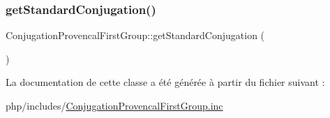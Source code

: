 \hypertarget{class_conjugation_provencal_first_group_aedd116ac330b4c069c860612d624badc}{}\label{class_conjugation_provencal_first_group_aedd116ac330b4c069c860612d624badc} 
\subsubsection{\texorpdfstring{get\+Standard\+Conjugation()}{getStandardConjugation()}}
{\footnotesize\ttfamily Conjugation\+Provencal\+First\+Group\+::get\+Standard\+Conjugation (\begin{DoxyParamCaption}{ }\end{DoxyParamCaption})\hspace{0.3cm}{\ttfamily [protected]}}



La documentation de cette classe a été générée à partir du fichier suivant \+:\begin{DoxyCompactItemize}
\item 
php/includes/\hyperlink{_conjugation_provencal_first_group_8inc}{Conjugation\+Provencal\+First\+Group.\+inc}\end{DoxyCompactItemize}
